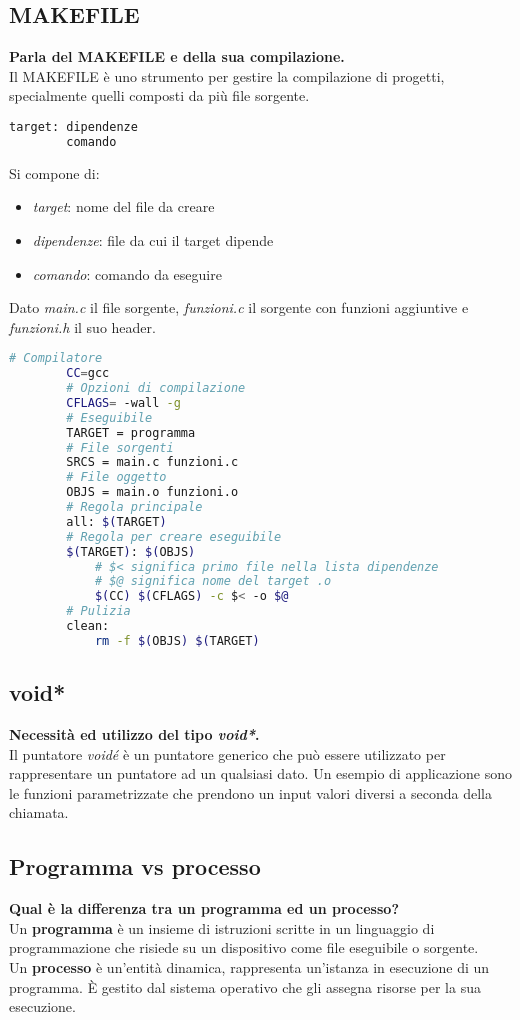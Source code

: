 \subsection{MAKEFILE}
\textbf{Parla del MAKEFILE e della sua compilazione.}\\
Il MAKEFILE è uno strumento per gestire la compilazione di progetti, specialmente quelli composti da più file sorgente.
\begin{lstlisting}[language=BASH]
	target: dipendenze
		comando
\end{lstlisting}
Si compone di:
\begin{itemize}
	\item \textit{target}: nome del file da creare
	\item \textit{dipendenze}: file da cui il target dipende
	\item \textit{comando}: comando da eseguire
\end{itemize}
\begin{example}[MAKEFILE]
	Dato \textit{main.c} il file sorgente, \textit{funzioni.c} il sorgente con funzioni aggiuntive e \textit{funzioni.h} il suo header.
	\begin{lstlisting}[language=BASH]
		# Compilatore
		CC=gcc
		# Opzioni di compilazione
		CFLAGS= -wall -g
		# Eseguibile
		TARGET = programma
		# File sorgenti
		SRCS = main.c funzioni.c
		# File oggetto
		OBJS = main.o funzioni.o
		# Regola principale
		all: $(TARGET)
		# Regola per creare eseguibile
		$(TARGET): $(OBJS)
			# $< significa primo file nella lista dipendenze
			# $@ significa nome del target .o
			$(CC) $(CFLAGS) -c $< -o $@
		# Pulizia
		clean:
			rm -f $(OBJS) $(TARGET)
	\end{lstlisting}
\end{example}

\subsection{void*}
\textbf{Necessità ed utilizzo del tipo \textit{void*}.}\\
Il puntatore \textit{voidé} è un puntatore generico che  può essere utilizzato per rappresentare un puntatore ad un qualsiasi dato. Un esempio di applicazione sono le funzioni parametrizzate che prendono un input valori diversi a seconda della chiamata.

\subsection{Programma vs processo}
\textbf{Qual è la differenza tra un programma ed un processo?}\\
Un \textbf{programma} è un insieme di istruzioni scritte in un linguaggio di programmazione che risiede su un dispositivo come file eseguibile o sorgente.\\
Un \textbf{processo} è un'entità dinamica, rappresenta un'istanza in esecuzione di un programma. È gestito dal sistema operativo che gli assegna risorse per la sua esecuzione.

